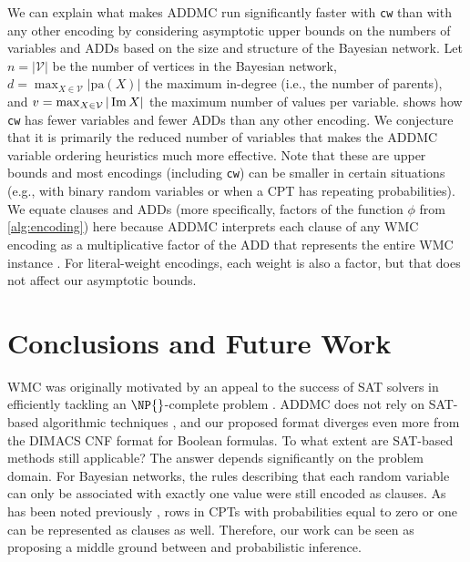 We can explain what makes \textsc{ADDMC} \citep{DBLP:conf/aaai/DudekPV20} run
significantly faster with \texttt{cw} than with any other encoding by
considering asymptotic upper bounds on the numbers of variables and ADDs based
on the size and structure of the Bayesian network. Let $n = |\mathcal{V}|$ be
the number of vertices in the Bayesian network, $d = \max_{X \in \mathcal{V}}
|\mathrm{pa}(X)|$ the maximum in-degree (i.e., the number of parents), and $v =
\max_{X \in \mathcal{V}} |\operatorname{Im} X|$ the maximum number of values per variable.
 shows how \texttt{cw} has fewer variables and fewer ADDs
than any other encoding. We conjecture that it is primarily the reduced number
of variables that makes the \textsc{ADDMC} variable ordering heuristics much
more effective. Note that these are upper bounds and most encodings (including
\texttt{cw}) can be smaller in certain situations (e.g., with binary random
variables or when a CPT has repeating probabilities). We equate clauses and ADDs
(more specifically, factors of the function $\phi$ from \cref{alg:encoding})
here because \textsc{ADDMC} interprets each clause of any WMC encoding as a
multiplicative factor of the ADD that represents the entire WMC instance
\citep{DBLP:conf/aaai/DudekPV20}. For literal-weight encodings, each weight is
also a factor, but that does not affect our asymptotic bounds.

\section{Conclusions and Future Work}

WMC was originally motivated by an appeal to the success of SAT solvers in
efficiently tackling an $\NP{}$-complete problem
\citep{DBLP:conf/aaai/SangBK05}. \textsc{ADDMC} does not rely on SAT-based
algorithmic techniques \citep{DBLP:conf/aaai/DudekPV20}, and our proposed format
diverges even more from the DIMACS CNF format for Boolean formulas. To what
extent are SAT-based methods still applicable? The answer depends significantly
on the problem domain. For Bayesian networks, the rules describing that each
random variable can only be associated with exactly one value were still encoded
as clauses. As has been noted previously \citep{DBLP:conf/sat/ChaviraD06}, rows
in CPTs with probabilities equal to zero or one can be represented as clauses as
well. Therefore, our work can be seen as proposing a middle ground between \mc{}
and probabilistic inference.

